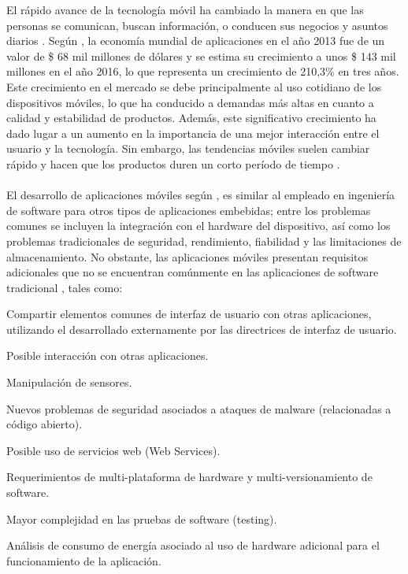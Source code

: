 

El rápido avance de la tecnología móvil ha cambiado la manera en que las personas se comunican, buscan información, o conducen sus negocios y asuntos diarios  \cite[p. 411]{jailani2015usability}.  Según \citet[p. 9]{VisionMobile2014},  la economía mundial de aplicaciones en el año 2013 fue de un valor de \$ 68 mil millones de dólares y se estima su crecimiento a unos \$ 143 mil millones en el año 2016, lo que representa un crecimiento de 210,3\% en tres años.  Este crecimiento en el mercado se debe principalmente al uso cotidiano de los dispositivos móviles, lo que ha conducido a demandas más altas en cuanto a calidad y estabilidad de productos. Además, este significativo crecimiento ha dado lugar a un aumento en la importancia de una mejor interacción entre el usuario y la tecnología. Sin embargo, las tendencias móviles suelen cambiar rápido y hacen que los productos duren un corto período de tiempo \cite[p.16-24]{Dutt2012experience}.\\
\\
El desarrollo de aplicaciones móviles según \citet[p. 379]{wasserman2010software}, es similar al empleado en ingeniería de software para otros tipos de aplicaciones embebidas; entre los problemas comunes se incluyen la integración con el hardware del dispositivo, así como los problemas tradicionales de seguridad, rendimiento, fiabilidad y las limitaciones de almacenamiento. No obstante, las aplicaciones móviles presentan requisitos adicionales que no se encuentran comúnmente en las aplicaciones de software tradicional \cite{wasserman2010software}, tales como:  
\\
\begin{viñetas}
\item Compartir elementos comunes de interfaz de usuario con otras aplicaciones, utilizando el desarrollado externamente por las directrices de interfaz de usuario.
\item Posible interacción con otras aplicaciones.
\item Manipulación de sensores.
\item Nuevos problemas de seguridad asociados a ataques de malware (relacionadas a código abierto).
\item Posible uso de servicios web (Web Services).
\item Requerimientos de multi-plataforma de hardware y multi-versionamiento de software.
\item Mayor complejidad en las pruebas de software (testing).
\item Análisis de consumo de energía asociado al uso de hardware adicional para el funcionamiento de la aplicación.
\\
\end{viñetas}
